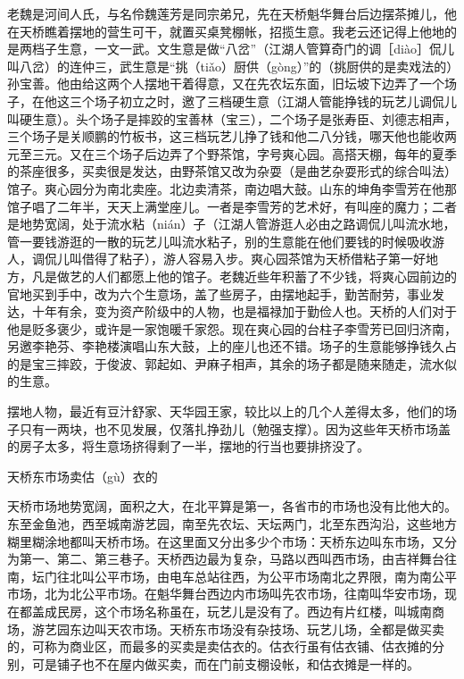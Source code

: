 \documentclass[12pt,UTF8]{ctexbook}
\begin{document}
老魏是河间人氏，与名伶魏莲芳是同宗弟兄，先在天桥魁华舞台后边摆茶摊儿，他在天桥瞧着摆地的营生可干，就置买桌凳棚帐，招揽生意。我老云还记得上他地的是两档子生意，一文一武。文生意是做“八岔”（江湖人管算奇门的调［diào］侃儿叫八岔）的连仲三，武生意是“挑（tiǎo）厨供（gòng）”的（挑厨供的是卖戏法的）孙宝善。他由给这两个人摆地干着得意，又在先农坛东面，旧坛坡下边弄了一个场子，在他这三个场子初立之时，邀了三档硬生意（江湖人管能挣钱的玩艺儿调侃儿叫硬生意）。头个场子是摔跤的宝善林（宝三），二个场子是张寿臣、刘德志相声，三个场子是关顺鹏的竹板书，这三档玩艺儿挣了钱和他二八分钱，哪天他也能收两元至三元。又在三个场子后边弄了个野茶馆，字号爽心园。高搭天棚，每年的夏季的茶座很多，买卖很是发达，由野茶馆又改为杂耍（是曲艺杂耍形式的综合叫法）馆子。爽心园分为南北卖座。北边卖清茶，南边唱大鼓。山东的坤角李雪芳在他那馆子唱了二年半，天天上满堂座儿。一者是李雪芳的艺术好，有叫座的魔力；二者是地势宽阔，处于流水粘（nián）子（江湖人管游逛人必由之路调侃儿叫流水地，管一要钱游逛的一散的玩艺儿叫流水粘子，别的生意能在他们要钱的时候吸收游人，调侃儿叫借得了粘子），游人容易入步。爽心园茶馆为天桥借粘子第一好地方，凡是做艺的人们都愿上他的馆子。老魏近些年积蓄了不少钱，将爽心园前边的官地买到手中，改为六个生意场，盖了些房子，由摆地起手，勤苦耐劳，事业发达，十年有余，变为资产阶级中的人物，也是福禄加于勤俭人也。天桥的人们对于他是贬多褒少，或许是一家饱暖千家怨。现在爽心园的台柱子李雪芳已回归济南，另邀李艳芬、李艳楼演唱山东大鼓，上的座儿也还不错。场子的生意能够挣钱久占的是宝三摔跤，于俊波、郭起如、尹麻子相声，其余的场子都是随来随走，流水似的生意。

摆地人物，最近有豆汁舒家、天华园王家，较比以上的几个人差得太多，他们的场子只有一两块，也不见发展，仅落扎挣劲儿（勉强支撑）。因为这些年天桥市场盖的房子太多，将生意场挤得剩了一半，摆地的行当也要排挤没了。





天桥东市场卖估（gù）衣的


天桥市场地势宽阔，面积之大，在北平算是第一，各省市的市场也没有比他大的。东至金鱼池，西至城南游艺园，南至先农坛、天坛两门，北至东西沟沿，这些地方糊里糊涂地都叫天桥市场。在这里面又分出多少个市场：天桥东边叫东市场，又分为第一、第二、第三巷子。天桥西边最为复杂，马路以西叫西市场，由吉祥舞台往南，坛门往北叫公平市场，由电车总站往西，为公平市场南北之界限，南为南公平市场，北为北公平市场。在魁华舞台西边内市场叫先农市场，往南叫华安市场，现在都盖成民房，这个市场名称虽在，玩艺儿是没有了。西边有片红楼，叫城南商场，游艺园东边叫天农市场。天桥东市场没有杂技场、玩艺儿场，全都是做买卖的，可称为商业区，而最多的买卖是卖估衣的。估衣行虽有估衣铺、估衣摊的分别，可是铺子也不在屋内做买卖，而在门前支棚设帐，和估衣摊是一样的。
\end{document}
